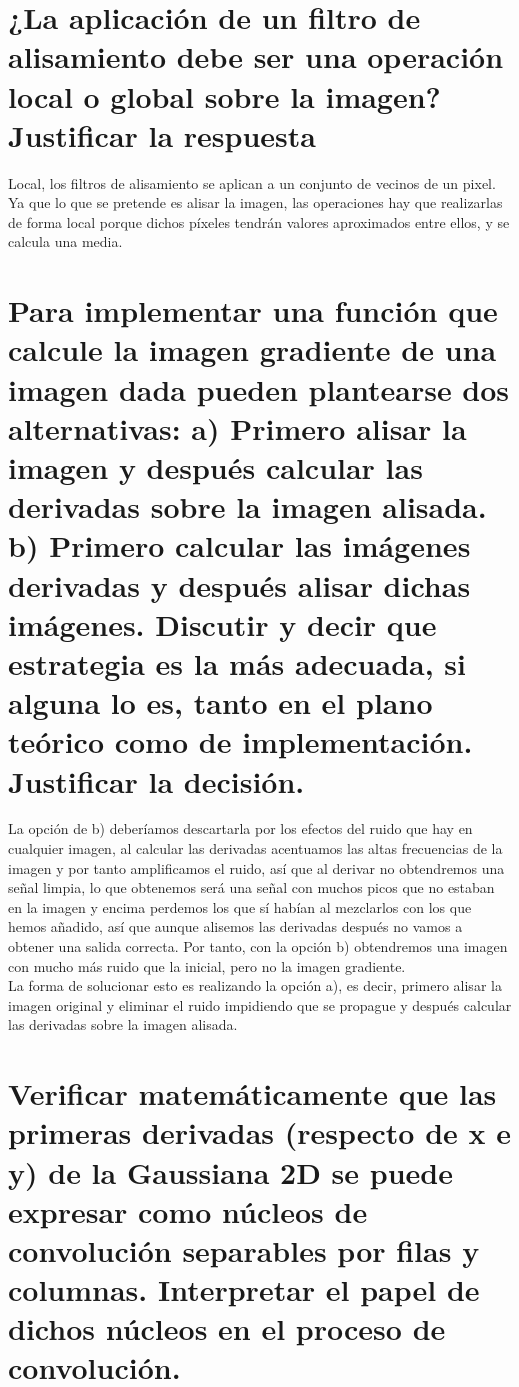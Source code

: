 \section{¿La aplicación de un filtro de alisamiento debe ser una operación local o global sobre la imagen? Justificar la respuesta}

Local, los filtros de alisamiento se aplican a un conjunto de vecinos de un pixel. Ya que lo que se pretende es alisar la imagen, las operaciones hay que realizarlas de forma local porque dichos píxeles tendrán valores aproximados entre ellos, y se calcula una media. 

\section{Para implementar una función que calcule la imagen gradiente de una imagen dada pueden plantearse dos alternativas: a) Primero alisar la imagen y después calcular las derivadas sobre la imagen alisada. b) Primero calcular las imágenes derivadas y después alisar dichas imágenes. Discutir y decir que estrategia es la más adecuada, si alguna lo es, tanto en el plano teórico como de implementación. Justificar la decisión.}

La opción de b) deberíamos descartarla por los efectos del ruido que hay en cualquier imagen, al calcular las derivadas acentuamos las altas frecuencias de la imagen y por tanto amplificamos el ruido, así que al derivar no obtendremos una señal limpia, lo que obtenemos será una señal con muchos picos que no estaban en la imagen y encima perdemos los que sí habían al mezclarlos con los que hemos añadido, así que aunque alisemos las derivadas después no vamos a obtener una salida correcta. Por tanto, con la opción b) obtendremos una imagen con mucho más ruido que la inicial, pero no la imagen gradiente.\\

La forma de solucionar esto es realizando la opción a), es decir, primero alisar la imagen original y eliminar el ruido impidiendo que se propague y después calcular las derivadas sobre la imagen alisada.\\



\section{Verificar matemáticamente que las primeras derivadas (respecto de x e y) de la Gaussiana 2D se puede expresar como núcleos de convolución separables por filas y columnas. Interpretar el papel de dichos núcleos en el proceso de convolución.}

